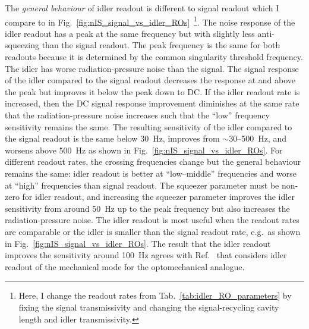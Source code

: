 The \emph{general behaviour} of idler readout is different to signal readout which I compare to in Fig.~\ref{fig:nIS_signal_vs_idler_ROs}~\footnote{Here, I change the readout rates from Tab.~\ref{tab:idler_RO_parameters} by fixing the signal transmissivity and changing the signal-recycling cavity length and idler transmissivity.}. The noise response of the idler readout has a peak at the same frequency but with slightly less anti-squeezing than the signal readout. The peak frequency is the same for both readouts because it is determined by the common singularity threshold frequency. The idler has worse radiation-pressure noise than the signal. The signal response of the idler compared to the signal readout decreases the response at and above the peak but improves it below the peak down to DC. If the idler readout rate is increased, then the DC signal response improvement diminishes at the same rate that the radiation-pressure noise increases such that the ``low'' frequency sensitivity remains the same. 
The resulting sensitivity of the idler compared to the signal readout is the same below 30~Hz, improves from $\sim$30--500~Hz, and worsens above 500~Hz as shown in Fig.~\ref{fig:nIS_signal_vs_idler_ROs}. For different readout rates, the crossing frequencies change but the general behaviour remains the same: idler readout is better at ``low--middle'' frequencies and worse at ``high'' frequencies than signal readout. The squeezer parameter must be non-zero for idler readout, and increasing the squeezer parameter improves the idler sensitivity from around 50~Hz up to the peak frequency but also increases the radiation-pressure noise. The idler readout is most useful when the readout rates are comparable or the idler is smaller than the signal readout rate, e.g.\ as shown in Fig.~\ref{fig:nIS_signal_vs_idler_ROs}.
The result that the idler readout improves the sensitivity around 100~Hz agrees with Ref.~\cite{liEnhancingInterferometerSensitivity2021} that considers idler readout of the mechanical mode for the optomechanical analogue.

